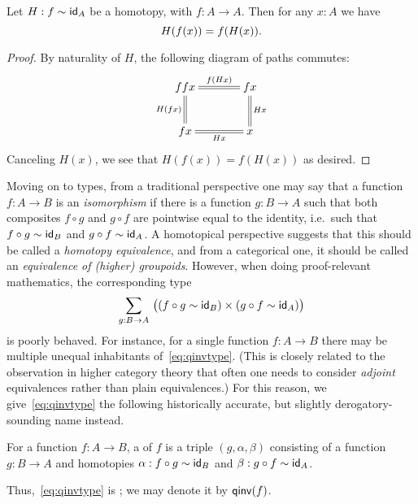 \begin{cor}\label{cor:hom-fg}
  Let $H : f \htpy \idfunc[A]$ be a homotopy, with $f : A \to A$. Then for any $x : A$ we have \[ H(f(x)) = \ap f{H(x)}. \]
\end{cor}
\begin{proof}
By naturality of $H$, the following diagram of paths commutes:
\begin{align*}
\xymatrix@C=3pc{
ffx \ar@{=}[r]^-{\ap f{Hx}} \ar@{=}[d]_{H(fx)} & fx \ar@{=}[d]^{Hx} \\
fx \ar@{=}[r]_-{Hx} & x
}
\end{align*}
Canceling $H(x)$, we see that $H(f(x)) = f(H(x))$ as desired.
\end{proof}

Moving on to types, from a traditional perspective one may say that a function $f:A\to B$ is an \emph{isomorphism} if there is a function $g:B\to A$ such that both composites $f\circ g$ and $g\circ f$ are pointwise equal to the identity, i.e.\ such that $f \circ g \htpy \idfunc[B]$ and $g\circ f \htpy \idfunc[A]$.
A homotopical perspective suggests that this should be called a \emph{homotopy equivalence}, and from a categorical one, it should be called an \emph{equivalence of (higher) groupoids}.
However, when doing proof-relevant mathematics, the corresponding type
\begin{equation}
  \sm{g:B\to A} \big((f \circ g \htpy \idfunc[B]) \times (g\circ f \htpy \idfunc[A])\big)\label{eq:qinvtype}
\end{equation}
is poorly behaved.
For instance, for a single function $f:A\to B$ there may be multiple unequal inhabitants of~\eqref{eq:qinvtype}.
(This is closely related to the observation in higher category theory that often one needs to consider \emph{adjoint} equivalences rather than plain equivalences.)
For this reason, we give~\eqref{eq:qinvtype} the following historically accurate, but slightly de\-rog\-a\-to\-ry-sounding name instead.

\begin{defn}
  For a function $f:A\to B$, a 
  of $f$ is a triple $(g,\alpha,\beta)$ consisting of a function $g:B\to A$ and homotopies
$\alpha:f\circ g\htpy \idfunc[B]$ and $\beta:g\circ f\htpy \idfunc[A]$.
\end{defn}

Thus,~\eqref{eq:qinvtype} is ; we may denote it by $\qinv(f)$.

